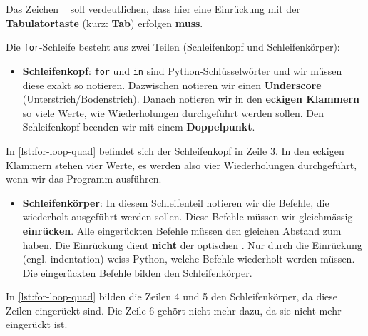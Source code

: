 \vspace{-0.7cm}

\begin{hinweis}
Das Zeichen \lstinline[language={python3}]{	} soll verdeutlichen, dass hier eine Einrückung mit der \textbf{Tabulatortaste} (kurz: \textbf{Tab}) erfolgen \textbf{muss}.
\end{hinweis}

\vspace{-0.25cm}

Die \lstinline[language={python3}]{for}-Schleife besteht aus zwei Teilen (Schleifenkopf und Schleifenkörper):

\begin{itemize}
\item \textbf{Schleifenkopf}: \lstinline[language={python3}]{for} und \lstinline[language={python3}]{in} sind Python-Schlüsselwörter und wir müssen diese exakt so notieren. Dazwischen notieren wir einen \textbf{Underscore} (Unterstrich/Bodenstrich). Danach notieren wir in den \textbf{eckigen Klammern} so viele Werte, wie Wiederholungen durchgeführt werden sollen. Den Schleifenkopf beenden wir mit einem \textbf{Doppelpunkt}.
\end{itemize}

\begin{example}
In \autoref{lst:for-loop-quad} befindet sich der Schleifenkopf in Zeile \num{3}. In den eckigen Klammern stehen vier Werte, es werden also vier Wiederholungen durchgeführt, wenn wir das Programm ausführen.
\end{example}

\begin{itemize}
\item \textbf{Schleifenkörper}: In diesem Schleifenteil notieren wir die Befehle, die wiederholt ausgeführt werden sollen. Diese Befehle müssen wir gleichmässig \textbf{einrücken}. Alle eingerückten Befehle müssen den gleichen Abstand zum  haben. Die Einrückung dient \textbf{nicht} der optischen . Nur durch die Einrückung (engl. indentation) weiss Python, welche Befehle wiederholt werden müssen. Die eingerückten Befehle bilden den Schleifenkörper.
\end{itemize}

\begin{example}
In \autoref{lst:for-loop-quad} bilden die Zeilen \num{4} und \num{5} den Schleifenkörper, da diese Zeilen eingerückt sind. Die Zeile \num{6} gehört nicht mehr dazu, da sie nicht mehr eingerückt ist.
\end{example}

